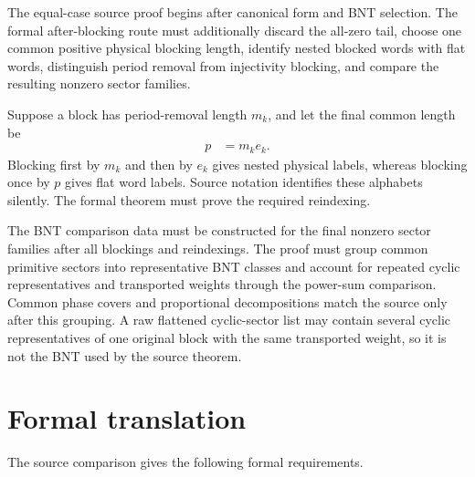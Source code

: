 \documentclass{article}
\begin{document}
The equal-case source proof begins after canonical form and BNT selection. The
formal after-blocking route must additionally discard the all-zero tail, choose
one common positive physical blocking length, identify nested blocked words
with flat words, distinguish period removal from injectivity blocking, and
compare the resulting nonzero sector families.

Suppose a block has period-removal length $m_k$, and let the final common
length be
\begin{align}
    p
        &=
        m_ke_k.
    \label{eq:rmp_nonperiodic_bnt_comparison_inputs_common_blocking_factorization}
\end{align}
Blocking first by $m_k$ and then by $e_k$ gives nested physical labels,
whereas blocking once by $p$ gives flat word labels. Source notation
identifies these alphabets silently. The formal theorem must prove the required
reindexing.

The BNT comparison data must be constructed for the final nonzero sector
families after all blockings and reindexings. The proof must group common
primitive sectors into representative BNT classes and account for repeated
cyclic representatives and transported weights through the power-sum
comparison. Common phase covers and proportional decompositions match the
source only after this grouping. A raw flattened cyclic-sector list may contain
several cyclic representatives of one original block with the same transported
weight, so it is not the BNT used by the source theorem.

\section{Formal translation}

The source comparison gives the following formal requirements.
\end{document}
